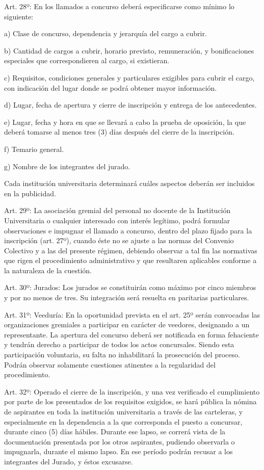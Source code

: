 \documentclass[]{article}
\begin{document}
Art. 28º: En los llamados a concurso deberá especificarse como mínimo lo
siguiente:

a) Clase de concurso, dependencia y jerarquía del cargo a cubrir.

b) Cantidad de cargos a cubrir, horario previsto, remuneración, y
bonificaciones especiales que correspondieren al cargo, si existieran.

c) Requisitos, condiciones generales y particulares exigibles para
cubrir el cargo, con indicación del lugar donde se podrá obtener mayor
información.

d) Lugar, fecha de apertura y cierre de inscripción y entrega de los
antecedentes.

e) Lugar, fecha y hora en que se llevará a cabo la prueba de oposición,
la que deberá tomarse al menos tres (3) días después del cierre de la
inscripción.

f) Temario general.

g) Nombre de los integrantes del jurado.

Cada institución universitaria determinará cuáles aspectos deberán ser
incluidos en la publicidad.

Art. 29º: La asociación gremial del personal no docente de la
Institución Universitaria o cualquier interesado con interés legítimo,
podrá formular observaciones e impugnar el llamado a concurso, dentro
del plazo fijado para la inscripción (art. 27º), cuando éste no se
ajuste a las normas del Convenio Colectivo y a las del presente régimen,
debiendo observar a tal fin las normativas que rigen el procedimiento
administrativo y que resultaren aplicables conforme a la naturaleza de
la cuestión.

Art. 30º: Jurados: Los jurados se constituirán como máximo por cinco
miembros y por no menos de tres. Su integración será resuelta en
paritarias particulares.

Art. 31º: Veeduría: En la oportunidad prevista en el art. 25º serán
convocadas las organizaciones gremiales a participar en carácter de
veedores, designando a un representante. La apertura del concurso deberá
ser notificada en forma fehaciente y tendrán derecho a participar de
todos los actos concursales. Siendo esta participación voluntaria, su
falta no inhabilitará la prosecución del proceso. Podrán observar
solamente cuestiones atinentes a la regularidad del procedimiento.

Art. 32º: Operado el cierre de la inscripción, y una vez verificado el
cumplimiento por parte de los presentados de los requisitos exigidos, se
hará pública la nómina de aspirantes en toda la institución
universitaria a través de las carteleras, y especialmente en la
dependencia a la que corresponda el puesto a concursar, durante cinco
(5) días hábiles. Durante ese lapso, se correrá vista de la
documentación presentada por los otros aspirantes, pudiendo observarla o
impugnarla, durante el mismo lapso. En ese período podrán recusar a los
integrantes del Jurado, y éstos excusarse.
\end{document}
